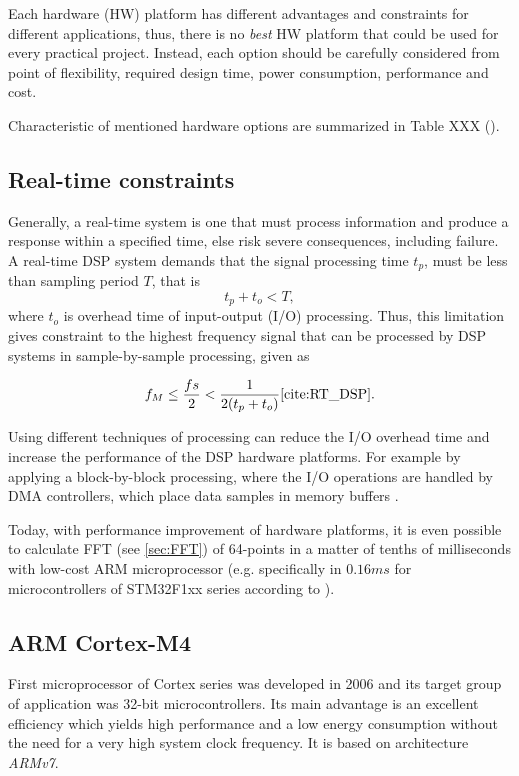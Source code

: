 \documentclass[twoside]{ctuthesis}
\theoremstyle{plain}
\theoremstyle{definition}
\theoremstyle{note}
\begin{document}
Each hardware (HW) platform has different advantages and constraints for different applications, thus, there is no \textit{best} HW platform that could be used for every practical project. Instead, each option should be carefully considered from point of flexibility, required design time, power consumption, performance and cost. 

Characteristic of mentioned hardware options are summarized in Table XXX (\cite{cite:RT_DSP}).

\subsection{Real-time constraints}
\label{R-T constrains}
Generally, a real-time system is one that must process information and produce a response within a specified time, else risk severe consequences, including failure. A real-time DSP system demands that the signal processing time $t_{p}$, must be less than sampling period $T$, that is
\begin{equation} \label{eq:hardRealTime1}
t_{p}+t_{o}<T,
\end{equation}
where $t_{o}$ is overhead time of input-output (I/O) processing.
Thus, this limitation gives constraint to the highest frequency signal that can be processed by DSP systems in sample-by-sample processing, given as

\begin{equation} \label{eq:hardRealTime2}
f_{M} \leq \frac{fs}{2} < \frac{1}{2(t_{p}+t_{o})} \cite{cite:RT_DSP}.
\end{equation}

Using different techniques of processing can reduce the I/O overhead time and increase the performance of the DSP hardware platforms. For example by applying a block-by-block processing, where the I/O operations are handled by DMA controllers, which place data samples in memory buffers \cite{cite:RT_DSP}.

Today, with performance improvement of hardware platforms, it is even possible to calculate FFT (see \ref{sec:FFT}) of 64-points in a matter of tenths of milliseconds with low-cost ARM microprocessor (e.g. specifically in $0.16 ms$ for microcontrollers of STM32F1xx series according to \cite{cite:STM32_DSP_library}).
\subsection{ARM Cortex-M4}
\label{sec:ARM_M3}
First microprocessor of Cortex series was developed in 2006 and its target group of application was 32-bit microcontrollers. Its main advantage is an excellent efficiency which yields high performance and a low energy consumption without the need for a very high system clock frequency. It is based on architecture \textit{ARMv7}.
\end{document}
